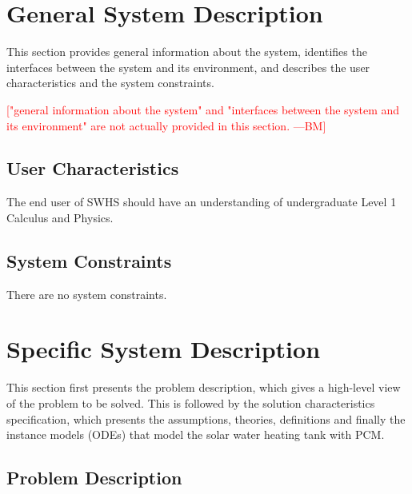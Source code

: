\documentclass[12pt]{article}
\newcommand{\authornote}[3]{\textcolor{#1}{[#3 ---#2]}}
\newcommand{\authornote}[3]{}
\newcommand{\bmac}[1]{\authornote{red}{BM}{#1}}
\newcommand{\progname}{SWHS}
\begin{document}

\section{General System Description}

This section provides general information about the system,
identifies the interfaces between the system and its environment, and describes the
user characteristics and the system constraints.

\bmac{"general information about the system" and "interfaces between the system and its environment" are not actually provided in this section.}


\subsection{User Characteristics}

The end user of \progname{} should have an understanding of undergraduate Level
1 Calculus and Physics.

\subsection{System Constraints}

There are no system constraints.

\section{Specific System Description}

This section first presents the problem description, which gives a high-level
view of the problem to be solved.  This is followed by the solution characteristics
specification, which presents the assumptions, theories, definitions and finally
the instance models (ODEs) that model the solar water heating tank with PCM.

\subsection{Problem Description} \label{Sec_pd}
\end{document}
